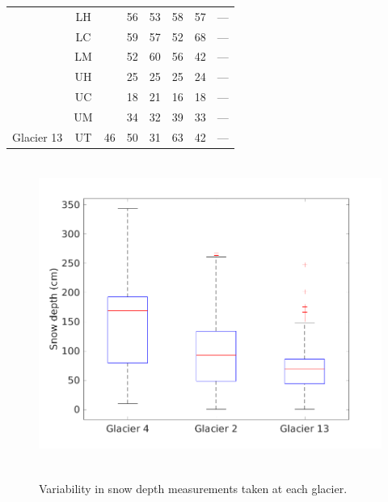 \documentclass[12pt]{article}
\begin{document}
\begin{table}[]
\begin{tabular}{cccccccc}
  & LH &   & 56 & 53 & 58 & 57 & --- \\
  
  & LC &   & 59 & 57 & 52 & 68 & --- \\
  
  & LM &   & 52 & 60 &56 & 42 & --- \\
  
  & UH &   &25 & 25 & 25 & 24 & --- \\
  
  & UC &   & 18 & 21 & 16 & 18 & --- \\
  
  & UM &   & 34 & 32 & 39 & 33 & --- \\
  
\multirow{-7}{*}{ Glacier 13} & UT & \multirow{-7}{*}{ 46} & 50 & 31 & 63 & 42 & ---
\end{tabular}
\end{table}



{
\begin{figure} 
\centering
	\includegraphics[height = 10cm]{box_depth.png}\\
	\caption{Variability in snow depth measurements taken at each glacier.}
	\label{fig:box_depth}
\end{figure}
}
\end{document}

